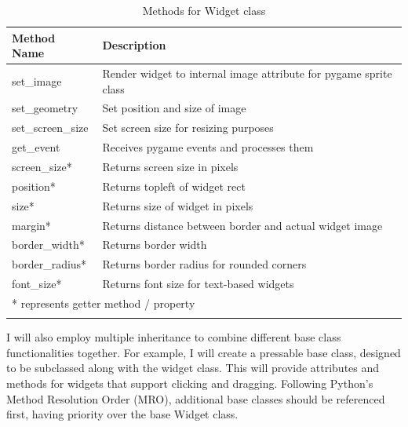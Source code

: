 \documentclass[../main/main.tex]{subfiles}
\begin{document}
\begin{longtable}[c]{l|l}
    \toprule
    \textbf{Method Name} & \textbf{Description}\\
    \midrule
    \endfirsthead
    \endhead

    set\_image & Render widget to internal image attribute for pygame sprite class\\
    set\_geometry & Set position and size of image\\
    set\_screen\_size & Set screen size for resizing purposes\\
    get\_event & Receives pygame events and processes them\\
    screen\_size* & Returns screen size in pixels\\
    position* & Returns topleft of widget rect\\
    size* & Returns size of widget in pixels\\
    margin* & Returns distance between border and actual widget image\\
    border\_width* & Returns border width\\
    border\_radius* & Returns border radius for rounded corners\\
    font\_size* & Returns font size for text-based widgets\\

    \midrule

    \multicolumn{2}{l}{* represents getter method / property}\\

    \bottomrule
    
\caption{Methods for Widget class}
\label{tab:widget-methods}
\end{longtable}

I will also employ multiple inheritance to combine different base class functionalities together. For example, I will create a pressable base class, designed to be subclassed along with the widget class. This will provide attributes and methods for widgets that support clicking and dragging. Following Python's Method Resolution Order (MRO), additional base classes should be referenced first, having priority over the base Widget class.
\end{document}
